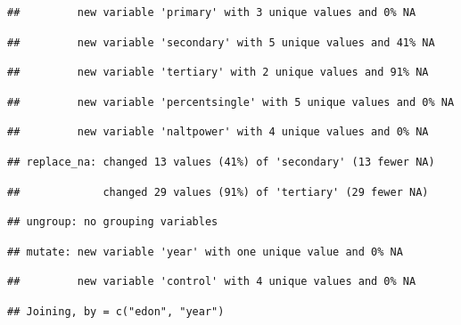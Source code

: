 \documentclass[]{article}
\newenvironment{Shaded}{\begin{snugshade}}{\end{snugshade}}
\newcommand{\KeywordTok}[1]{\textcolor[rgb]{0.13,0.29,0.53}{\textbf{#1}}}
\newcommand{\NormalTok}[1]{#1}
\newcommand{\OperatorTok}[1]{\textcolor[rgb]{0.81,0.36,0.00}{\textbf{#1}}}
\newcommand{\StringTok}[1]{\textcolor[rgb]{0.31,0.60,0.02}{#1}}
\begin{document}
\begin{verbatim}
##         new variable 'primary' with 3 unique values and 0% NA
\end{verbatim}

\begin{verbatim}
##         new variable 'secondary' with 5 unique values and 41% NA
\end{verbatim}

\begin{verbatim}
##         new variable 'tertiary' with 2 unique values and 91% NA
\end{verbatim}

\begin{verbatim}
##         new variable 'percentsingle' with 5 unique values and 0% NA
\end{verbatim}

\begin{verbatim}
##         new variable 'naltpower' with 4 unique values and 0% NA
\end{verbatim}

\begin{verbatim}
## replace_na: changed 13 values (41%) of 'secondary' (13 fewer NA)
\end{verbatim}

\begin{verbatim}
##             changed 29 values (91%) of 'tertiary' (29 fewer NA)
\end{verbatim}

\begin{verbatim}
## ungroup: no grouping variables
\end{verbatim}

\begin{verbatim}
## mutate: new variable 'year' with one unique value and 0% NA
\end{verbatim}

\begin{verbatim}
##         new variable 'control' with 4 unique values and 0% NA
\end{verbatim}

\begin{Shaded}
\end{Shaded}

\begin{verbatim}
## Joining, by = c("edon", "year")
\end{verbatim}
\end{document}

